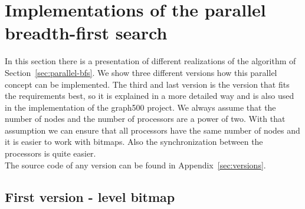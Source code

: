 \documentclass[12pt,a4paper]{article}
\begin{document}
\section{Implementations of the parallel breadth-first search}
\label{sec:implementations}

In this section there is a presentation of different realizations of the algorithm of Section~\ref{sec:parallel-bfs}. We show three different versions how this parallel concept can be implemented. The third and last version is the version that fits the requirements best, so it is explained in a more detailed way and is also used in the implementation of the graph500 project. We always assume that the number of nodes and the number of processors are a power of two. With that assumption we can ensure that all processors have the same number of nodes and it is easier to work with bitmaps. Also the synchronization between the processors is quite easier.\\
The source code of any version can be found in Appendix~\ref{sec:versions}.

\subsection{First version - level bitmap}
\label{sec:firstversion}
\end{document}
